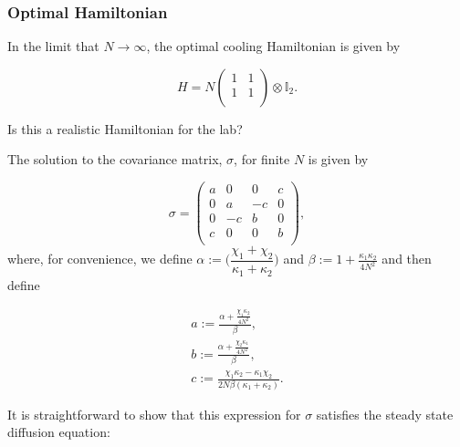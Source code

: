 \documentclass[11pt,a4paper]{article}
\numberwithin{equation}{section}
\begin{document}
	\subsubsection{Optimal Hamiltonian}
	
	In the limit that $N \rightarrow \infty$, the optimal cooling Hamiltonian is given by
	
	\begin{equation*}
	H = N \begin{pmatrix}
	1 & 1 \\
	1 & 1\\
	\end{pmatrix} \otimes \mathbb{I}_2.
	\end{equation*}

	\color{blue}Is this a realistic Hamiltonian for the lab?\color{black}
	
	The solution to the covariance matrix, $\sigma$, for finite $N$ is given by 
	
	\begin{equation*}
	\sigma = \begin{pmatrix}
	a & 0 & 0 & c\\
	0 & a & -c & 0\\
	0 & -c & b & 0 \\
	c & 0 & 0 & b\\
	\end{pmatrix},
	\end{equation*}	
	where, for convenience, we define $\alpha := \Big(\dfrac{\chi_1 + \chi_2}{\kappa_1 + \kappa_2}\Big)$ and $\beta := 1 + \frac{\kappa_1 \kappa_2}{4N^2}$ and then define
	
	
	\begin{align*}
	&a := \frac{\alpha + \frac{\chi_1 \kappa_2}{4N^2}}{\beta},&\\
	&b := \frac{\alpha + \frac{\chi_2 \kappa_1}{4N^2}}{\beta},&\\
	&c := \frac{\chi_1 \kappa_2 - \kappa_1 \chi_2}{2N\beta (\kappa_1+\kappa_2)}.&		
	\end{align*}


	It is straightforward to show that this expression for $\sigma$ satisfies the steady state diffusion equation:
\end{document}
